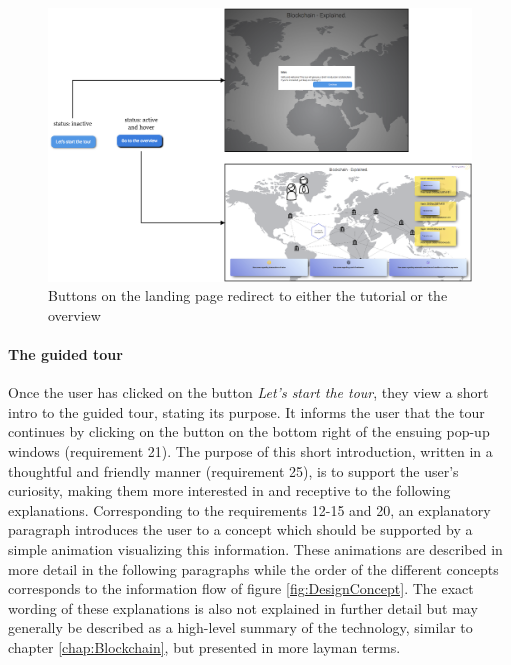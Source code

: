 \begin{figure}
    \centering
    \includegraphics[width=\textwidth]{latex-vorlage_v1.5/graphics/protoAll.png}
    \caption{Buttons on the landing page redirect to either the tutorial or the overview}
    \label{fig:ButtonStyle}
\end{figure}

\paragraph{The guided tour} Once the user has clicked on the button \textit{Let's start the tour}, they view a short intro to the guided tour, stating its purpose. It informs the user that the tour continues by clicking on the button on the bottom right of the ensuing pop-up windows (requirement 21). The purpose of this short introduction, written in a thoughtful and friendly manner (requirement 25), is to support the user's curiosity, making them more interested in and receptive to the following explanations. Corresponding to the requirements 12-15 and 20, an explanatory paragraph introduces the user to a concept which should be supported by a simple animation visualizing this information. These animations are described in more detail in the following paragraphs while the order of the different concepts corresponds to the information flow of figure \ref{fig:DesignConcept}. The exact wording of these explanations is also not explained in further detail but may generally be described as a high-level summary of the technology, similar to chapter \ref{chap:Blockchain}, but presented in more layman terms.

